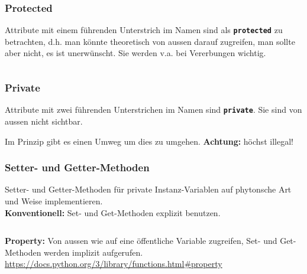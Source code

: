 \begin{minipage}[t]{0.49\textwidth}
	\subsubsection{Protected}
	Attribute mit einem führenden Unterstrich im Namen sind als \textbf{\texttt{protected}} zu betrachten, d.h. man könnte theoretisch von aussen darauf zugreifen, man sollte aber nicht, es ist unerwünscht. Sie werden v.a. bei Vererbungen wichtig.
\end{minipage}
\begin{minipage}[t]{0.02\textwidth} $\quad$ \end{minipage}
\begin{minipage}[t]{0.49\textwidth}
	
\end{minipage}



\subsubsection{Private}
Attribute mit zwei führenden Unterstrichen im Namen sind \textbf{\texttt{private}}. Sie sind von aussen nicht sichtbar.

Im Prinzip gibt es einen Umweg um dies zu umgehen. \textbf{Achtung:} höchst illegal!


\subsubsection{Setter- und Getter-Methoden}
\begin{minipage}[t]{0.34\textwidth}
	$\quad$ \\[30pt]
	Setter- und Getter-Methoden für private Instanz-Variablen auf phytonsche Art und Weise implementieren.\\
	\textbf{Konventionell:} Set- und Get-Methoden explizit benutzen.
\end{minipage}
\begin{minipage}[t]{0.02\textwidth} $\quad$ \end{minipage}
\begin{minipage}[t]{0.64\textwidth}
	
\end{minipage}

\begin{minipage}[t]{0.34\textwidth}
		$\quad$ \\[35pt]
	\textbf{Property:} Von aussen wie auf eine öffentliche Variable zugreifen, Set- und Get-Methoden werden implizit aufgerufen.\\
	\url{https://docs.python.org/3/library/functions.html#property}
\end{minipage}
\begin{minipage}[t]{0.02\textwidth} $\quad$ \end{minipage}
\begin{minipage}[t]{0.64\textwidth}
	
\end{minipage}

